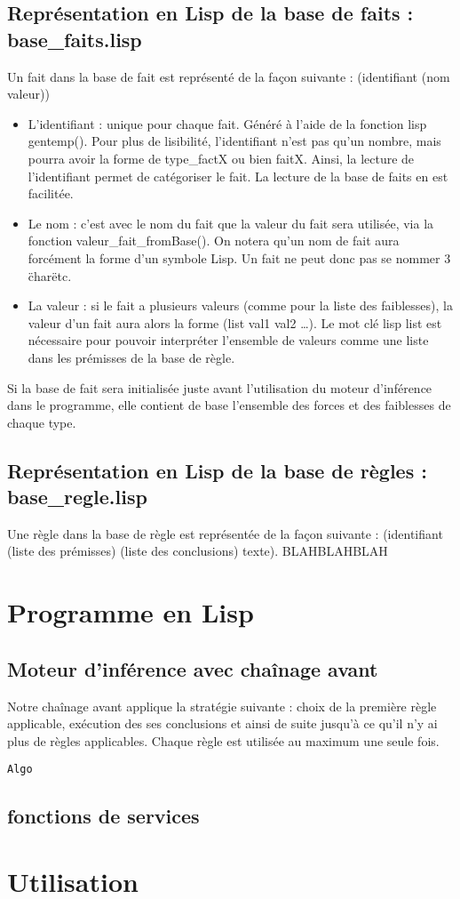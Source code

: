 \documentclass[a4paper, 12pt, final]{article}
\begin{document}
\subsection{Représentation en Lisp de la base de faits : base\_faits.lisp}
Un fait dans la base de fait est représenté de la façon suivante : (identifiant (nom valeur))
\begin{itemize}
	\item L'identifiant : unique pour chaque fait. Généré à l'aide de la fonction lisp gentemp(). Pour plus de lisibilité, l'identifiant n'est pas qu'un nombre, mais pourra avoir la forme de type\_factX ou bien faitX. Ainsi, la lecture de l'identifiant permet de catégoriser le fait. La lecture de la base de faits en est facilitée.
	\item Le nom : c'est avec le nom du fait que la valeur du fait sera utilisée, via la fonction valeur\_fait\_fromBase(). On notera qu'un nom de fait aura forcément la forme d'un symbole Lisp. Un fait ne peut donc pas se nommer 3 \"char\" etc.
	\item La valeur : si le fait a plusieurs valeurs (comme pour la liste des faiblesses), la valeur d'un fait aura alors la forme (list val1 val2 \ldots). Le mot clé lisp list est nécessaire pour pouvoir interpréter l'ensemble de valeurs comme une liste dans les prémisses de la base de règle.
\end{itemize}
Si la base de fait sera initialisée juste avant l'utilisation du moteur d'inférence dans le programme, elle contient de base l'ensemble des forces et des faiblesses de chaque type. 
\subsection{Représentation en Lisp de la base de règles : base\_regle.lisp}
Une règle dans la base de règle est représentée de la façon suivante : (identifiant (liste des prémisses) (liste des conclusions) texte).
BLAHBLAHBLAH

\section{Programme en Lisp}
\subsection{Moteur d'inférence avec chaînage avant}
Notre chaînage avant applique la stratégie suivante : choix de la première
règle applicable, exécution des ses conclusions et ainsi de suite
jusqu'à ce qu'il n'y ai plus de règles applicables. Chaque règle est utilisée au maximum une seule fois.\\

\begin{verbatim}
Algo
\end{verbatim}

\subsection{fonctions de services}

\section{Utilisation}
\end{document}
